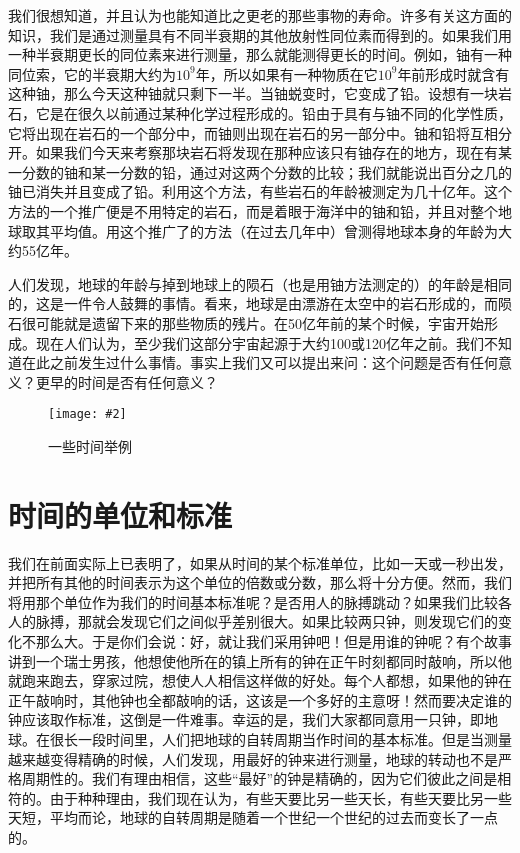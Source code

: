 \documentclass[12pt,oneside]{book}
\newenvironment{fig}[2][1]
{\begin{figure}[H]
\centering
\texttt{[image: \#2]}}
{\end{figure}}
\begin{document}
我们很想知道，并且认为也能知道比之更老的那些事物的寿命。许多有关这方面的知识，我们是通过测量具有不同半衰期的其他放射性同位素而得到的。如果我们用一种半衰期更长的同位素来进行测量，那么就能测得更长的时间。例如，铀有一种同位索，它的半衰期大约为$ 10^9 $年，所以如果有一种物质在它$ 10^9 $年前形成时就含有这种铀，那么今天这种铀就只剩下一半。当铀蜕变时，它变成了铅。设想有一块岩石，它是在很久以前通过某种化学过程形成的。铅由于具有与铀不同的化学性质，它将出现在岩石的一个部分中，而铀则出现在岩石的另一部分中。铀和铅将互相分开。如果我们今天来考察那块岩石将发现在那种应该只有铀存在的地方，现在有某一分数的铀和某一分数的铅，通过对这两个分数的比较；我们就能说出百分之几的铀已消失并且变成了铅。利用这个方法，有些岩石的年龄被测定为几十亿年。这个方法的一个推广便是不用特定的岩石，而是着眼于海洋中的铀和铅，并且对整个地球取其平均值。用这个推广了的方法（在过去几年中）曾测得地球本身的年龄为大约55亿年。

人们发现，地球的年龄与掉到地球上的陨石（也是用铀方法测定的）的年龄是相同的，这是一件令人鼓舞的事情。看来，地球是由漂游在太空中的岩石形成的，而陨石很可能就是遗留下来的那些物质的残片。在50亿年前的某个时候，宇宙开始形成。现在人们认为，至少我们这部分宇宙起源于大约100或120亿年之前。我们不知道在此之前发生过什么事情。事实上我们又可以提出来问：这个问题是否有任何意义？更早的时间是否有任何意义？

\begin{fig}{一些时间举例}
\caption{一些时间举例}
\label{fig:一些时间举例}
\end{fig}


\section{时间的单位和标准}
我们在前面实际上已表明了，如果从时间的某个标准单位，比如一天或一秒出发，并把所有其他的时间表示为这个单位的倍数或分数，那么将十分方便。然而，我们将用那个单位作为我们的时间基本标准呢？是否用人的脉搏跳动？如果我们比较各人的脉搏，那就会发现它们之间似乎差别很大。如果比较两只钟，则发现它们的变化不那么大。于是你们会说：好，就让我们采用钟吧！但是用谁的钟呢？有个故事讲到一个瑞士男孩，他想使他所在的镇上所有的钟在正午时刻都同时敲响，所以他就跑来跑去，穿家过院，想使人人相信这样做的好处。每个人都想，如果他的钟在正午敲响时，其他钟也全都敲响的话，这该是一个多好的主意呀！然而要决定谁的钟应该取作标准，这倒是一件难事。幸运的是，我们大家都同意用一只钟，即地球。在很长一段时间里，人们把地球的自转周期当作时间的基本标准。但是当测量越来越变得精确的时候，人们发现，用最好的钟来进行测量，地球的转动也不是严格周期性的。我们有理由相信，这些“最好”的钟是精确的，因为它们彼此之间是相符的。由于种种理由，我们现在认为，有些天要比另一些天长，有些天要比另一些天短，平均而论，地球的自转周期是随着一个世纪一个世纪的过去而变长了一点的。
\end{document}
